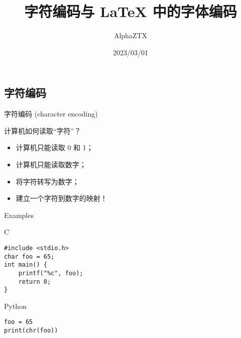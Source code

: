 \documentclass{beamer}
\title{字符编码与 \LaTeX{} 中的字体编码}
\author{AlphaZTX}
\date{2023/03/01}
\begin{document}
\maketitle

\begin{frame}
\section{字符编码}
\end{frame}

\begin{frame}{字符编码 (character encoding)}
\begin{exampleblock}{计算机如何读取“字符”？}\pause
\begin{itemize}%
\item 计算机只能读取 0 和 1；
\item 计算机只能读取数字；
\item 将字符转写为数字；%
\item 建立一个字符到数字的映射！
\end{itemize}
\end{exampleblock}
\end{frame}

\begin{frame}[fragile]{Examples}
\begin{exampleblock}{C}
\begin{verbatim}
#include <stdio.h>
char foo = 65;
int main() {
    printf("%c", foo);
    return 0;
}
\end{verbatim}
\end{exampleblock}
\begin{exampleblock}{Python}
\begin{verbatim}
foo = 65
print(chr(foo))
\end{verbatim}
\end{exampleblock}
\end{frame}
\end{document}

